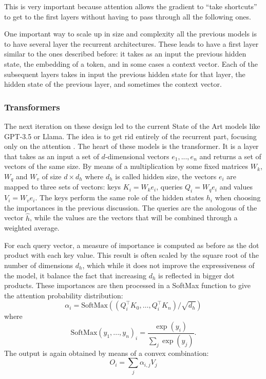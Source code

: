 \documentclass[]{marticle}
\begin{document}
This is very important because attention allows the gradient to ``take shortcuts'' to get to the first
layers without having to pass through all the following ones.

One important way to scale up in size and complexity all the previous models is to have several
layer the recurrent architectures. These leads to have a first layer similar to the ones described
before: it takes as an input the previous hidden state, the embedding of a token, and in some cases
a context vector. Each of the subsequent layers takes in input the previous hidden state for that
layer, the hidden state of the previous layer, and sometimes the context vector.

\subsubsection{Transformers} \label{sec:transformers}

The next iteration on these design led to the current State of the Art models like GPT-3.5 or Llama.
The idea is to get rid entirely of the recurrent part, focusing only on the attention
\cite{attention-all-need}. The heart of these models is the transformer. It is a layer that takes as
an input a set of $d$-dimensional vectors $e_1,..., e_n$ and returns a set of vectors of the same
size. By means of a multiplication by some fixed matrices $W_k$, $W_q$ and $W_v$ of size $d\times
d_h$ where $d_h$ is called hidden size, the vectors $e_i$ are mapped to three sets of vectors: keys
$K_i = W_k e_i$, queries $Q_i = W_q e_i$ and values $V_i = W_v e_i$. The keys perform the same role
of the hidden states $h_i$ when choosing the importances in the previous discussion. The queries are
the anologous of the vector $\hat{h}$, while the values are the vectors that will be combined
through a weighted average.

For each query vector, a measure of importance is computed as before as the dot product with each
key value. This result is often scaled by the square root of the number of dimensions $d_h$, which
while it does not improve the expressiveness of the model, it balance the fact that increasing $d_h$
is reflected in bigger dot products. These importances are then processed in a SoftMax function to
give the attention probability distribution:
$$ \alpha_i = \text{SoftMax}((Q_i^\top K_0, \dots, Q_i^\top K_n) / \sqrt{d_h}) $$
where 
$$ \text{SoftMax}(y_1,...,y_n)_i = \frac{\exp(y_i)}{\sum_j \exp (y_j)}. $$
The output is again obtained by means of a convex combination:
$$ O_i = \sum_j \alpha_{i,j} V_j $$
\end{document}
